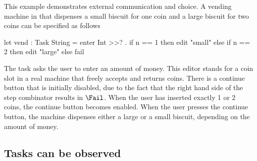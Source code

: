 \begin{example}
\label{Vending machine}

This example demonstrates external communication and choice.
A vending machine in \TOPHAT that dispenses a small biscuit for one coin and a large biscuit for two coins can be specified as follows
\begin{TASK}
  let vend : Task String = enter Int >>? \n. if n == 1 then edit "small"
    else if n == 2 then edit "large"
    else fail
\end{TASK}
The task asks the user to enter an amount of money.
This editor stands for a coin slot in a real machine that freely accepts and returns coins.
There is a continue button that is initially disabled, due to the fact that the right hand side of the step combinator results in $\Fail$.
When the user has inserted exactly 1 or 2 coins, the continue button becomes enabled.
When the user presses the continue button, the machine dispenses either a large or a small biscuit, depending on the amount of money.

\end{example}



\subsection{Tasks can be observed}

